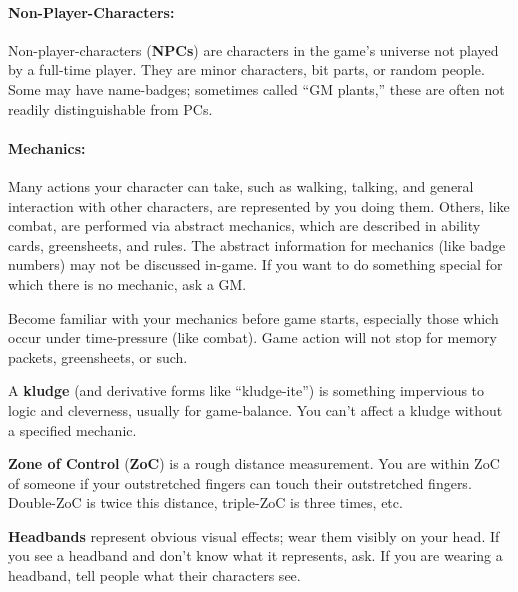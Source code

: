 \documentclass[sheet]{airship}
\begin{document}
\paragraph{Non-Player-Characters:} Non-player-characters ({\bf NPCs})
are characters in the game's universe not played by a full-time
player.  They are minor characters, bit parts, or random people.  Some
may have name-badges; sometimes called ``GM plants,'' these are often
not readily distinguishable from PCs.

\paragraph{Mechanics:} Many actions your character can take, such as
walking, talking, and general interaction with other characters, are
represented by you doing them.  Others, like combat, are performed via
abstract mechanics, which are described in ability cards, greensheets,
and rules.  The abstract information for mechanics (like badge
numbers) may not be discussed in-game.  If you want to do something
special for which there is no mechanic, ask a GM.

Become familiar with your mechanics before game starts, especially
those which occur under time-pressure (like combat).  Game action will
not stop for memory packets, greensheets, or such.

A {\bf kludge} (and derivative forms like ``kludge-ite'') is something
impervious to logic and cleverness, usually for game-balance.  You
can't affect a kludge without a specified mechanic.

{\bf Zone of Control} ({\bf ZoC}) is a rough distance measurement.
You are within ZoC of someone if your outstretched fingers can touch
their outstretched fingers.  Double-ZoC is twice this distance,
triple-ZoC is three times, etc.

{\bf Headbands} represent obvious visual effects; wear them visibly on
your head.  If you see a headband and don't know what it represents,
ask.  If you are wearing a headband, tell people what their characters
see.

\end{document}
